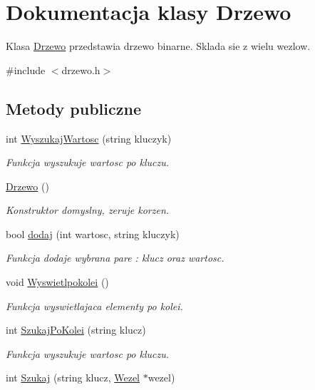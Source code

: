 \hypertarget{class_drzewo}{\section{Dokumentacja klasy Drzewo}
\label{class_drzewo}
}


Klasa \hyperlink{class_drzewo}{Drzewo} przedstawia drzewo binarne. Sklada sie z wielu wezlow.  




{\ttfamily \#include $<$drzewo.\-h$>$}

\subsection*{Metody publiczne}
\begin{DoxyCompactItemize}
\item 
int \hyperlink{class_drzewo_a3cc4b6778603a1bb0d98c4435d5cf068}{Wyszukaj\-Wartosc} (string kluczyk)
\begin{DoxyCompactList}\small\item\em Funkcja wyszukuje wartosc po kluczu. \end{DoxyCompactList}\item 
\hyperlink{class_drzewo_a309a5197b6a02c761f046fc99136eebb}{Drzewo} ()
\begin{DoxyCompactList}\small\item\em Konstruktor domyslny, zeruje korzen. \end{DoxyCompactList}\item 
bool \hyperlink{class_drzewo_a50373a0a15637acc4e8f961b1a53cb37}{dodaj} (int wartosc, string kluczyk)
\begin{DoxyCompactList}\small\item\em Funkcja dodaje wybrana pare \-: klucz oraz wartosc. \end{DoxyCompactList}\item 
void \hyperlink{class_drzewo_a3d58680a7f5d118119ca564c6a4b1018}{Wyswietlpokolei} ()
\begin{DoxyCompactList}\small\item\em Funkcja wyswietlajaca elementy po kolei. \end{DoxyCompactList}\item 
int \hyperlink{class_drzewo_acd93d1914b0d5e706568d3bc6dbf47d2}{Szukaj\-Po\-Kolei} (string klucz)
\begin{DoxyCompactList}\small\item\em Funkcja wyszukuje wartosc po kluczu. \end{DoxyCompactList}\item 
int \hyperlink{class_drzewo_a6ffc09aae59accd698b76867de7dd696}{Szukaj} (string klucz, \hyperlink{class_wezel}{Wezel} $\ast$wezel)
\end{DoxyCompactItemize}



